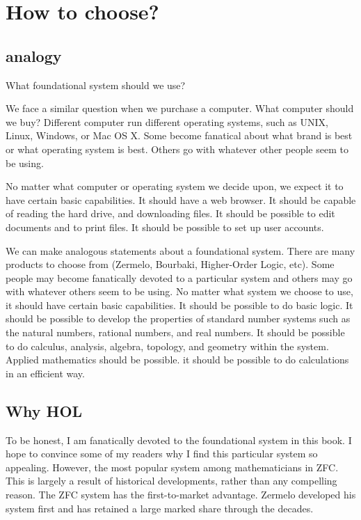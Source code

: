 \documentclass[cup9a]{cupbook}
\begin{document}
\section{How to choose?}

\subsection{analogy}

What foundational system should we use?

We face a similar question when we purchase a computer.  What computer should we buy?  Different computer run different operating systems, such as UNIX, Linux, Windows, or Mac OS X.  Some become fanatical about what brand is best or what operating system is best.  Others go with whatever other people seem to be using.

No matter what computer or operating system we decide upon, we expect it to have certain basic capabilities.  It should have a web browser.  It should be capable of reading the hard drive, and downloading files.  It should be possible to edit documents and to print files.  It should be possible to set up user accounts.

We can make analogous statements about a foundational system.  There are
many products to choose from (Zermelo, Bourbaki, Higher-Order Logic, etc).  Some people may become fanatically devoted to a particular system and others may go with whatever others seem to be using.  No matter what system we choose to use, it should have certain basic capabilities.  It should be possible to do basic logic.  It should be possible to develop the properties of standard number systems such as the natural numbers, rational numbers, and real numbers.  It should be possible to do calculus, analysis, algebra, topology, and geometry within the system.  Applied mathematics should be possible.  it should be possible to do calculations in an efficient way.

\subsection{Why HOL}

To be honest, I am fanatically devoted to the foundational system in this book.  I hope to convince some of my readers why I find this particular system so appealing.  However, the most popular system among mathematicians in ZFC.  This is largely a result of historical developments, rather than any compelling reason.  The ZFC system has the first-to-market advantage.  Zermelo developed his system first and has retained a large marked share through the decades.
\end{document}
